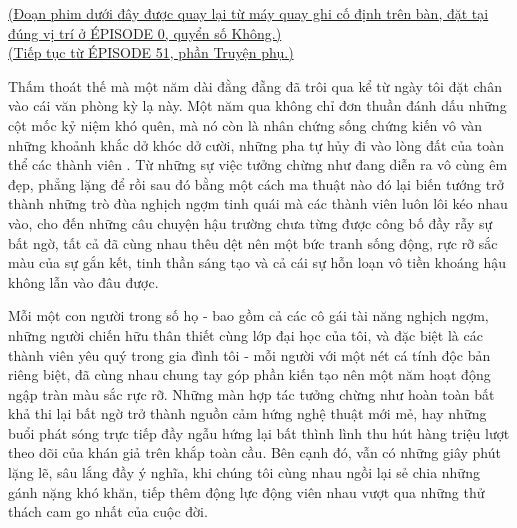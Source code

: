 \documentclass[../main.tex]{subfiles}
\begin{document}
\begin{center}
  \uline{(Đoạn phim dưới đây được quay lại từ máy quay ghi cố định trên bàn, đặt tại đúng vị trí ở {\flaregothic ÉPISODE 0}, quyển số Không.)\\(Tiếp tục từ {\flaregothic ÉPISODE 51}, phần {\abv Truyện phụ}.)}
\end{center}



Thấm thoát thế mà một năm dài đằng đẵng đã trôi qua kể từ ngày tôi đặt chân vào cái văn phòng kỳ lạ này. Một năm qua không chỉ đơn thuần đánh dấu những cột mốc kỷ niệm khó quên, mà nó còn là nhân chứng sống chứng kiến vô vàn những khoảnh khắc dở khóc dở cười, những pha tự hủy đi vào lòng đất của toàn thể các thành viên \hll. Từ những sự việc tưởng chừng như đang diễn ra vô cùng êm đẹp, phẳng lặng để rồi sau đó bằng một cách ma thuật nào đó lại biến tướng trở thành những trò đùa nghịch ngợm tinh quái mà các thành viên luôn lôi kéo nhau vào, cho đến những câu chuyện hậu trường chưa từng được công bố đầy rẫy sự bất ngờ, tất cả đã cùng nhau thêu dệt nên một bức tranh sống động, rực rỡ sắc màu của sự gắn kết, tinh thần sáng tạo và cả cái sự hỗn loạn vô tiền khoáng hậu không lẫn vào đâu được.

Mỗi một con người trong số họ - bao gồm cả các cô gái tài năng nghịch ngợm, những người chiến hữu thân thiết cùng lớp đại học của tôi, và đặc biệt là các thành viên yêu quý trong gia đình tôi - mỗi người với một nét cá tính độc bản riêng biệt, đã cùng nhau chung tay góp phần kiến tạo nên một năm hoạt động ngập tràn màu sắc rực rỡ. Những màn hợp tác tưởng chừng như hoàn toàn bất khả thi lại bất ngờ trở thành nguồn cảm hứng nghệ thuật mới mẻ, hay những buổi phát sóng trực tiếp đầy ngẫu hứng lại bất thình lình thu hút hàng triệu lượt theo dõi của khán giả trên khắp toàn cầu. Bên cạnh đó, vẫn có những giây phút lặng lẽ, sâu lắng đầy ý nghĩa, khi chúng tôi cùng nhau ngồi lại sẻ chia những gánh nặng khó khăn, tiếp thêm động lực động viên nhau vượt qua những thử thách cam go nhất của cuộc đời.
\end{document}
